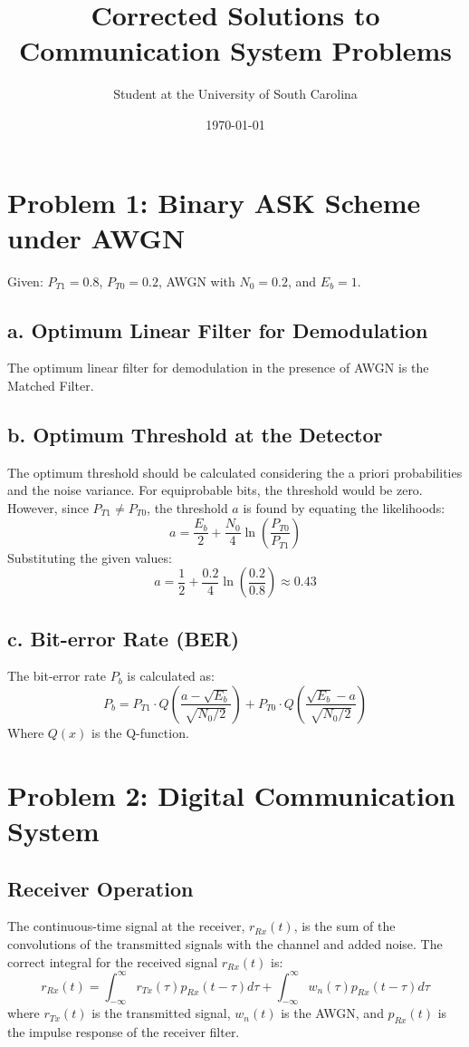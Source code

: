 \documentclass[11pt]{article}
\title{Corrected Solutions to Communication System Problems}
\author{Student at the University of South Carolina}
\date{\today}
\begin{document}
\maketitle

\section*{Problem 1: Binary ASK Scheme under AWGN}

Given: \( P_{T1} = 0.8 \), \( P_{T0} = 0.2 \), AWGN with \( N_0 = 0.2 \), and \( E_b = 1 \).

\subsection*{a. Optimum Linear Filter for Demodulation}
The optimum linear filter for demodulation in the presence of AWGN is the Matched Filter.

\subsection*{b. Optimum Threshold at the Detector}
The optimum threshold should be calculated considering the a priori probabilities and the noise variance. For equiprobable bits, the threshold would be zero. However, since \( P_{T1} \neq P_{T0} \), the threshold \( a \) is found by equating the likelihoods:
\[
a = \frac{E_b}{2} + \frac{N_0}{4} \ln\left(\frac{P_{T0}}{P_{T1}}\right)
\]
Substituting the given values:
\[
a = \frac{1}{2} + \frac{0.2}{4} \ln\left(\frac{0.2}{0.8}\right) \approx 0.43
\]

\subsection*{c. Bit-error Rate (BER)}
The bit-error rate \( P_b \) is calculated as:
\[
P_b = P_{T1} \cdot Q\left(\frac{a - \sqrt{E_b}}{\sqrt{N_0/2}}\right) + P_{T0} \cdot Q\left(\frac{\sqrt{E_b} - a}{\sqrt{N_0/2}}\right)
\]
Where \( Q(x) \) is the Q-function.

\section*{Problem 2: Digital Communication System}

\subsection*{Receiver Operation}
The continuous-time signal at the receiver, \( r_{Rx}(t) \), is the sum of the convolutions of the transmitted signals with the channel and added noise. The correct integral for the received signal \( r_{Rx}(t) \) is:
\[
r_{Rx}(t) = \int_{-\infty}^{\infty} r_{Tx}(\tau) p_{Rx}(t - \tau) d\tau + \int_{-\infty}^{\infty} w_n(\tau) p_{Rx}(t - \tau) d\tau
\]
where \( r_{Tx}(t) \) is the transmitted signal, \( w_n(t) \) is the AWGN, and \( p_{Rx}(t) \) is the impulse response of the receiver filter.
\end{document}
